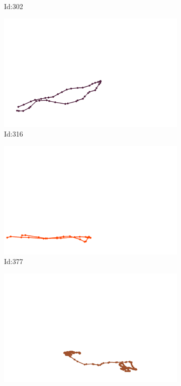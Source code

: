 \documentclass[12pt,twoside]{report}
\begin{document}
\begin{figure}
\begin{subfigure}[b]{0.20\textwidth}
\caption{Id:302}
\end{subfigure}
\begin{subfigure}[b]{0.20\textwidth}
\centering
\includegraphics[width=\textwidth]{../trajectories/316.png}
\caption{Id:316}
\end{subfigure}
\begin{subfigure}[b]{0.20\textwidth}
\centering
\includegraphics[width=\textwidth]{../trajectories/377.png}
\caption{Id:377}
\end{subfigure}
\begin{subfigure}[b]{0.20\textwidth}
\centering
\includegraphics[width=\textwidth]{../trajectories/537.png}

\end{subfigure}
\end{figure}
\end{document}
